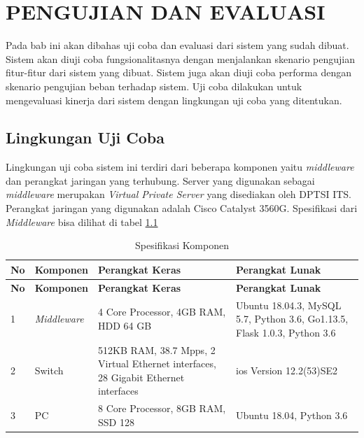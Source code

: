 \chapter{PENGUJIAN DAN EVALUASI}
Pada bab ini akan dibahas uji coba dan evaluasi dari sistem yang sudah dibuat. Sistem akan diuji coba fungsionalitasnya dengan menjalankan skenario pengujian fitur-fitur dari sistem yang dibuat. Sistem juga akan diuji coba performa dengan skenario pengujian beban terhadap sistem. Uji coba dilakukan untuk mengevaluasi kinerja dari sistem dengan lingkungan uji coba yang ditentukan.

\section{Lingkungan Uji Coba}
Lingkungan uji coba sistem ini terdiri dari beberapa komponen yaitu \textit{middleware} dan perangkat jaringan yang terhubung. Server yang digunakan sebagai \textit{middleware} merupakan \textit{Virtual Private Server} yang disediakan oleh DPTSI ITS. Perangkat jaringan yang digunakan adalah Cisco Catalyst 3560G. Spesifikasi dari \textit{Middleware} bisa dilihat di tabel \ref{tabelKomponen} 
   \begin{longtable}{|p{}|p{}|p{}|p{}|}
   	
   	\caption{Spesifikasi Komponen} \label{tabelKomponen} \\
   	\hline
   	\textbf{No} & \textbf{Komponen} & \textbf{Perangkat Keras} & \textbf{Perangkat Lunak} \\ \hline
   	\endfirsthead
   	
   	\hline
   	\textbf{No} & \textbf{Komponen} & \textbf{Perangkat Keras} & \textbf{Perangkat Lunak} \\ \hline
   	\endhead
   	\endfoot
   	\endlastfoot
   	
   	1 & \textit{Middleware} & 4 Core Processor, 4GB RAM, HDD 64 GB & Ubuntu 18.04.3, MySQL 5.7, Python 3.6, Go1.13.5, Flask 1.0.3, Python 3.6 \\ \hline
   	2 & Switch & 512KB RAM, 38.7 Mpps, 2 Virtual Ethernet interfaces, 28 Gigabit Ethernet interfaces & ios Version 12.2(53)SE2 \\ \hline
   	3 & PC & 8 Core Processor, 8GB RAM, SSD 128 & Ubuntu 18.04, Python 3.6 \\ \hline
		
   	
   \end{longtable}

